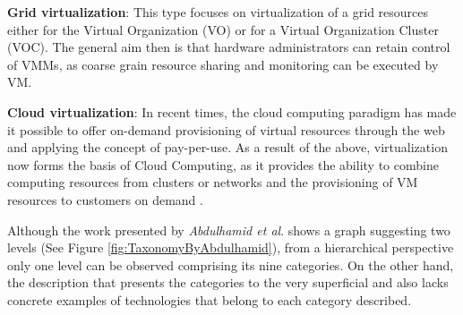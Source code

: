 	\textbf{Grid virtualization}: This type focuses on virtualization of a grid resources either for the Virtual Organization (VO) or for a Virtual Organization Cluster (VOC). The general aim then is that hardware administrators can retain control of VMMs, as coarse grain resource sharing and monitoring can be executed by VM.
	
	\textbf{Cloud virtualization}: In recent times, the cloud computing paradigm has made it possible to offer on-demand provisioning of virtual resources through the web and applying the concept of pay-per-use. As a result of the above, virtualization now forms the basis of Cloud Computing, as it provides the ability to combine computing resources from clusters or networks and the provisioning of VM resources to customers on demand \cite{Abdulhamid2014, Aceto2013}.
	
	
	Although the work presented by \textit{Abdulhamid et al}. \cite{Abdulhamid2014} shows a graph suggesting two levels (See Figure \ref{fig:TaxonomyByAbdulhamid}), from a hierarchical perspective only one level can be observed comprising its nine categories. On the other hand, the description that presents the categories to the very superficial and also lacks concrete examples of technologies that belong to each category described. 
	
	
